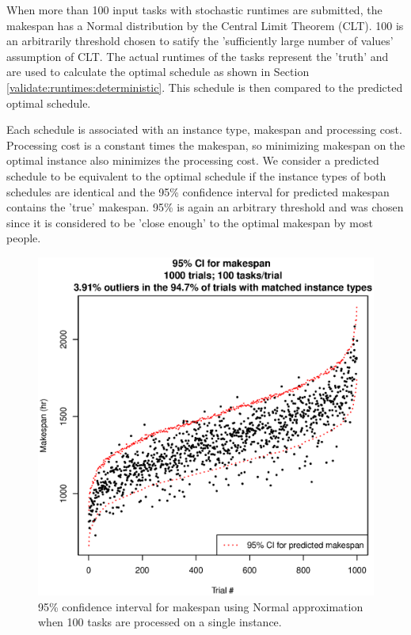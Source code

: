 \documentclass[12pt]{report}
\begin{document}
When more than 100 input tasks with stochastic runtimes are submitted, the makespan has a Normal distribution by the Central Limit Theorem (CLT).
100 is an arbitrarily threshold chosen to satify the 'sufficiently large number of values' assumption of CLT.
The actual runtimes of the tasks represent the 'truth' and are used to calculate the optimal schedule as shown in Section \ref{validate:runtimes:deterministic}. 
This schedule is then compared to the predicted optimal schedule. 

Each schedule is associated with an instance type, makespan and processing cost. 
Processing cost is a constant times the makespan, so minimizing makespan on the optimal instance also minimizes the processing cost.
We consider a predicted schedule to be equivalent to the optimal schedule if the instance types of both schedules are identical and the 95\% confidence interval for predicted makespan contains the 'true' makespan.
95\% is again an arbitrary threshold and was chosen since it is considered to be 'close enough' to the optimal makespan by most people.

\begin{figure}
\includegraphics[width=1\textwidth]{validate-stochastic-runtimes-1000-trials-100-tasks.eps}
\caption{95\% confidence interval for makespan using Normal approximation when 100 tasks are processed on a single instance.}
\label{fig:validate-stochastic-runtimes-1000-trials-100-tasks}
\end{figure}
\end{document}
